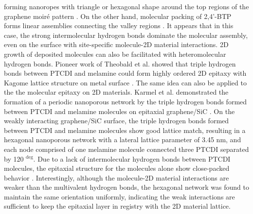 forming nanoropes with triangle or hexagonal shape around the top
regions of the graphene moiré pattern \cite{Roos_2011_BTP_gr}. On the
other hand, molecular packing of 2,4'-BTP forms linear assemblies
connecting the valley regions \cite{Roos_2011_hiera_org_gr}. It appears
that in this case, the strong intermolecular hydrogen bonds dominate
the molecular assembly, even on the surface with site-specific
molecule-2D material interactions. 2D growth of deposited molecules
can also be facilitated with heteromolecular hydrogen bonds. Pioneer
work of Theobald et al. showed that triple hydrogen bonds
between PTCDI and melamine could form highly ordered 2D epitaxy with
Kagome lattice structure on metal surface
\cite{theobald_2003_assembl}. The same idea can also be applied to the
the molecular epitaxy on 2D materials. Karmel et al. demonstrated the
formation of a periodic nanoporous network by the triple hydrogen
bonds formed between PTCDI and melamine molecules on epitaxial
graphene/SiC \cite{Karmel_2014_assembl_hetero_gr}. On the weakly
interacting graphene/SiC surface, the triple hydrogen bonds formed
between PTCDI and melamine molecules show good lattice match,
resulting in a hexagonal nanoporous network with a lateral lattice
parameter of 3.45 nm, and each node comprised of one melamine molecule
connected three PTCDI separated by 120 \(^{\deg}\). Due to a lack of
intermolecular hydrogen bonds between PTCDI molecules, the epitaxial
structure for the molecules alone show close-packed behavior
\cite{Karmel_2014_PTCDI_gr}. Interestingly, although the molecule-2D
material interactions are weaker than the multivalent hydrogen bonds,
the hexagonal network was found to maintain the same orientation
uniformly, indicating the weak interactions are sufficient to keep the
epitaxial layer in registry with the 2D material lattice.

